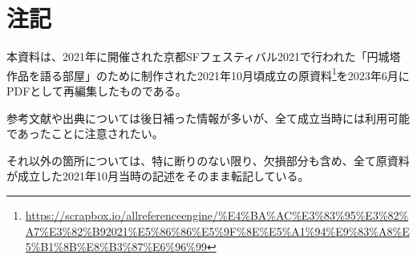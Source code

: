 \documentclass[10pt, a5paper, twoside]{jsarticle}
\begin{document}
	\section*{注記}

		本資料は、2021年に開催された京都SFフェスティバル2021で行われた「円城塔作品を語る部屋」のために制作された2021年10月頃成立の原資料\footnote{\url{https://scrapbox.io/allreferenceengine/%E4%BA%AC%E3%83%95%E3%82%A7%E3%82%B92021%E5%86%86%E5%9F%8E%E5%A1%94%E9%83%A8%E5%B1%8B%E8%B3%87%E6%96%99}}を2023年6月にPDFとして再編集したものである。

		参考文献や出典については後日補った情報が多いが、全て成立当時には利用可能であったことに注意されたい。

		それ以外の箇所については、特に断りのない限り、欠損部分も含め、全て原資料が成立した2021年10月当時の記述をそのまま転記している。
\end{document}
